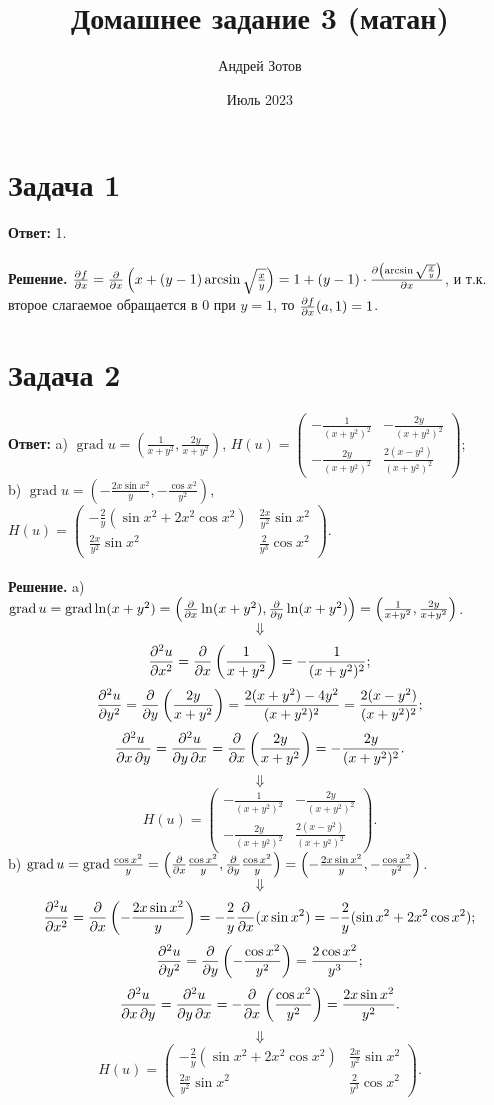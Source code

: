 \documentclass{article}
\title{Домашнее задание 3 (матан)}
\author{Андрей Зотов}
\date{Июль 2023}
\DeclareMathOperator{\grad}{grad}
\begin{document}
\maketitle

\section*{Задача 1}
{\bf Ответ:} 1.
\\
\\
{\bf Решение.} $\pdv{f}{x}=\pdv*{\left(x+(y-1)\arcsin \sqrt{\frac{x}{y}}\right)}{x}=1+(y-1)\cdot\pdv{\left(\arcsin \sqrt{\frac{x}{y}}\right)}{x}$, и т.к. второе слагаемое обращается в 0 при $y=1$, то $\pdv{f}{x}(a,1)=1$.
\section*{Задача 2}
{\bf Ответ:} a) $\grad u = \left(\frac{1}{x+y^2}, \frac{2y}{x+y^2}\right)$, $H(u)=\left(\begin{array}{rr}-\frac{1}{(x+y^2)^2} & -\frac{2y}{(x+y^2)^2}\\-\frac{2y}{(x+y^2)^2} & \frac{2(x-y^2)}{(x+y^2)^2}\end{array}\right)$;
\\
b) $\grad u = \left(-\frac{2x\sin x^2}{y}, -\frac{\cos x^2}{y^2}\right)$, $H(u)=\left(\begin{array}{cc}-\frac{2}{y}(\sin x^2 + 2x^2\cos x^2) & \frac{2x}{y^2}\sin x^2\\\frac{2x}{y^2}\sin x^2 & \frac{2}{y^3}\cos x^2\end{array}\right)$.
\\
\\
{\bf Решение.} a) $\grad u = \grad \ln(x+y^2)=\left(\pdv*{\ln(x+y^2)}{x} , \pdv*{\ln(x+y^2)}{y} \right)=\left(\frac{1}{x+y^2}, \frac{2y}{x+y^2}\right)$.
$$\Downarrow$$
$$\pdv[order=2]{u}{x}=\pdv*{\left(\frac{1}{x+y^2}\right)}{x}=-\frac{1}{(x+y^2)^2};$$
$$\pdv[order=2]{u}{y}=\pdv*{\left(\frac{2y}{x+y^2}\right)}{y}=\frac{2(x+y^2)-4y^2}{(x+y^2)^2}=\frac{2(x-y^2)}{(x+y^2)^2};$$
$$\pdv{u}{x,y}=\pdv{u}{y,x}=\pdv*{\left(\frac{2y}{x+y^2}\right)}{x}=-\frac{2y}{(x+y^2)^2}.$$
$$\Downarrow$$
$$H(u)=\left(\begin{array}{rr}-\frac{1}{(x+y^2)^2} & -\frac{2y}{(x+y^2)^2}\\-\frac{2y}{(x+y^2)^2} & \frac{2(x-y^2)}{(x+y^2)^2}\end{array}\right).$$
b) $\grad u = \grad \frac{\cos x^2}{y}=\left(\pdv*{\frac{\cos x^2}{y}}{x},\pdv*{\frac{\cos x^2}{y}}{y}\right)=\left(-\frac{2x\sin x^2}{y}, -\frac{\cos x^2}{y^2}\right)$.
$$\Downarrow$$
$$\pdv[order=2]{u}{x}=\pdv*{\left(-\frac{2x\sin x^2}{y}\right)}{x}=-\frac{2}{y}\pdv*{(x\sin x^2)}{x}=-\frac{2}{y}(\sin x^2+2x^2\cos x^2);$$
$$\pdv[order=2]{u}{y}=\pdv*{\left(-\frac{\cos x^2}{y^2}\right)}{y}=\frac{2\cos x^2}{y^3};$$
$$\pdv{u}{x,y}=\pdv{u}{y,x}=-\pdv*{\left(\frac{\cos x^2}{y^2}\right)}{x}=\frac{2x\sin x^2}{y^2}.$$
$$\Downarrow$$
$$H(u)=\left(\begin{array}{cc}-\frac{2}{y}(\sin x^2 + 2x^2\cos x^2) & \frac{2x}{y^2}\sin x^2\\\frac{2x}{y^2}\sin x^2 & \frac{2}{y^3}\cos x^2\end{array}\right).$$
\end{document}
